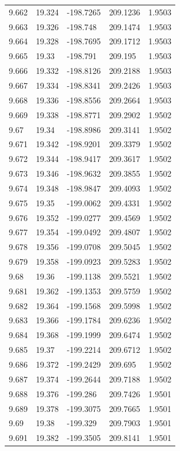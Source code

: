 \begin{tabular}{lllll}
9.662 & 19.324 & -198.7265 & 209.1236 & 1.9503 \\
9.663 & 19.326 & -198.748 & 209.1474 & 1.9503 \\
9.664 & 19.328 & -198.7695 & 209.1712 & 1.9503 \\
9.665 & 19.33 & -198.791 & 209.195 & 1.9503 \\
9.666 & 19.332 & -198.8126 & 209.2188 & 1.9503 \\
9.667 & 19.334 & -198.8341 & 209.2426 & 1.9503 \\
9.668 & 19.336 & -198.8556 & 209.2664 & 1.9503 \\
9.669 & 19.338 & -198.8771 & 209.2902 & 1.9502 \\
9.67 & 19.34 & -198.8986 & 209.3141 & 1.9502 \\
9.671 & 19.342 & -198.9201 & 209.3379 & 1.9502 \\
9.672 & 19.344 & -198.9417 & 209.3617 & 1.9502 \\
9.673 & 19.346 & -198.9632 & 209.3855 & 1.9502 \\
9.674 & 19.348 & -198.9847 & 209.4093 & 1.9502 \\
9.675 & 19.35 & -199.0062 & 209.4331 & 1.9502 \\
9.676 & 19.352 & -199.0277 & 209.4569 & 1.9502 \\
9.677 & 19.354 & -199.0492 & 209.4807 & 1.9502 \\
9.678 & 19.356 & -199.0708 & 209.5045 & 1.9502 \\
9.679 & 19.358 & -199.0923 & 209.5283 & 1.9502 \\
9.68 & 19.36 & -199.1138 & 209.5521 & 1.9502 \\
9.681 & 19.362 & -199.1353 & 209.5759 & 1.9502 \\
9.682 & 19.364 & -199.1568 & 209.5998 & 1.9502 \\
9.683 & 19.366 & -199.1784 & 209.6236 & 1.9502 \\
9.684 & 19.368 & -199.1999 & 209.6474 & 1.9502 \\
9.685 & 19.37 & -199.2214 & 209.6712 & 1.9502 \\
9.686 & 19.372 & -199.2429 & 209.695 & 1.9502 \\
9.687 & 19.374 & -199.2644 & 209.7188 & 1.9502 \\
9.688 & 19.376 & -199.286 & 209.7426 & 1.9501 \\
9.689 & 19.378 & -199.3075 & 209.7665 & 1.9501 \\
9.69 & 19.38 & -199.329 & 209.7903 & 1.9501 \\
9.691 & 19.382 & -199.3505 & 209.8141 & 1.9501 \\

\end{tabular}

